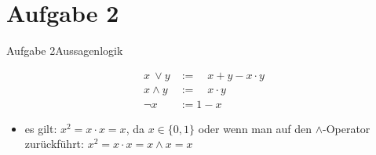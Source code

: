 
\section{Aufgabe 2}

\setcounter{task}{1}

\begin{frame}[allowframebreaks]{Aufgabe 2}{Aussagenlogik}
\begin{requirementsnoinc}
  \begin{align*}
    x\ \vee y &:=\quad x+y-x\cdot y\\
    x\wedge y &:=\quad x\cdot y\\
    {\neg x}  &:={1-x}
  \end{align*}
  \begin{itemize}
    \item \alert{es gilt:} $x^{2}=x\cdot x=x$, da $x\in\{0,1\}$ oder wenn man auf den $\wedge$-Operator zurückführt: $x^{2}=x\cdot x=x\wedge x=x$
  \end{itemize}
\end{requirementsnoinc}



\end{frame}
